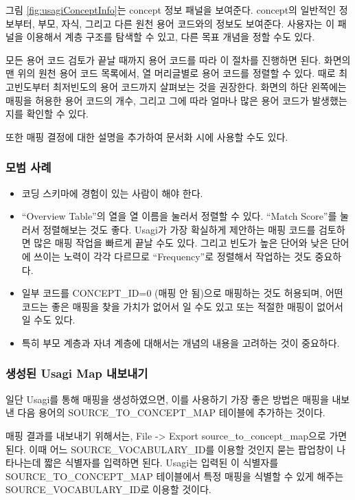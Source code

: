 \documentclass[10.5pt]{book}
\providecommand{\tightlist}{%
  \setlength{\itemsep}{0pt}\setlength{\parskip}{0pt}}
\theoremstyle{definition}
\theoremstyle{definition}
\theoremstyle{definition}
\theoremstyle{remark}
\begin{document}
그림 \ref{fig:usagiConceptInfo}는 concept 정보 패널을 보여준다.
concept의 일반적인 정보부터, 부모, 자식, 그리고 다른 원천 용어 코드와의
정보도 보여준다. 사용자는 이 패널을 이용해서 계층 구조를 탐색할 수 있고,
다른 목표 개념을 정할 수도 있다.

모든 용어 코드 검토가 끝날 때까지 용어 코드를 따라 이 절차를 진행하면
된다. 화면의 맨 위의 원천 용어 코드 목록에서, 열 머리글별로 용어 코드를
정렬할 수 있다. 때로 최고빈도부터 최저빈도의 용어 코드까지 살펴보는 것을
권장한다. 화면의 하단 왼쪽에는 매핑을 허용한 용어 코드의 개수, 그리고
그에 따라 얼마나 많은 용어 코드가 발생했는지를 확인할 수 있다.

또한 매핑 결정에 대한 설명을 추가하여 문서화 시에 사용할 수도 있다.

\subsubsection*{모범 사례}\label{-}

\begin{itemize}
\tightlist
\item
  코딩 스키마에 경험이 있는 사람이 해야 한다.
\item
  ``Overview Table''의 열을 열 이름을 눌러서 정렬할 수 있다. ``Match
  Score''를 눌러서 정렬해보는 것도 좋다. Usagi가 가장 확실하게 제안하는
  매핑 코드를 검토하면 많은 매핑 작업을 빠르게 끝날 수도 있다. 그리고
  빈도가 높은 단어와 낮은 단어에 쓰이는 노력이 각각 다르므로
  ``Frequency''로 정렬해서 작업하는 것도 중요하다.
\item
  일부 코드를 CONCEPT\_ID=0 (매핑 안 됨)으로 매핑하는 것도 허용되며,
  어떤 코드는 좋은 매핑을 찾을 가치가 없어서 일 수도 있고 또는 적절한
  매핑이 없어서 일 수도 있다.
\item
  특히 부모 계층과 자녀 계층에 대해서는 개념의 내용을 고려하는 것이
  중요하다.
\end{itemize}

\subsubsection*{생성된 Usagi Map 내보내기}\label{-usagi-map-}

일단 Usagi를 통해 매핑을 생성하였으면, 이를 사용하기 가장 좋은 방법은
매핑을 내보낸 다음 용어의 SOURCE\_TO\_CONCEPT\_MAP 테이블에 추가하는
것이다.

매핑 결과를 내보내기 위해서는, File -\textgreater{} Export
source\_to\_concept\_map으로 가면 된다. 이때 어느
SOURCE\_VOCABULARY\_ID를 이용할 것인지 묻는 팝업창이 나타나는데 짧은
식별자를 입력하면 된다. Usagi는 입력된 이 식별자를
SOURCE\_TO\_CONCEPT\_MAP 테이블에서 특정 매핑을 식별할 수 있게 해주는
SOURCE\_VOCABULARY\_ID로 이용할 것이다.
\end{document}
